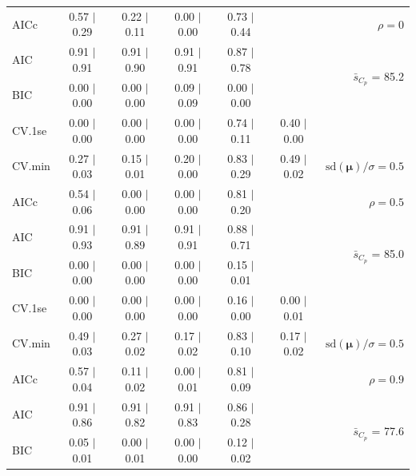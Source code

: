 \documentclass[12pt]{article}
\newcommand{\mr}[1]{\mathrm{#1}}
\newcommand{\bm}[1]{\mathbf{#1}}
\begin{document}
\begin{table}[p]
\begin{center}
\begin{tabular}{l*{5}{c}|r}
AICc & 0.57 $\mid$ 0.29 & 0.22 $\mid$ 0.11 & 0.00 $\mid$ 0.00 & 0.73 $\mid$ 0.44 & & $\rho=0$ \\
AIC & 0.91 $\mid$ 0.91 & 0.91 $\mid$ 0.90 & 0.91 $\mid$ 0.91 & 0.87 $\mid$ 0.78 & & \multirow{2}{*}{$\bar{s}_{C_p}$ = 85.2} \\
BIC & 0.00 $\mid$ 0.00 & 0.00 $\mid$ 0.00 & 0.09 $\mid$ 0.09 & 0.00 $\mid$ 0.00 & & \\
 \hline 
CV.1se & 0.00 $\mid$ 0.00 & 0.00 $\mid$ 0.00 & 0.00 $\mid$ 0.00 & 0.74 $\mid$ 0.11 & 0.40 $\mid$ 0.00 &\\
CV.min & 0.27 $\mid$ 0.03 & 0.15 $\mid$ 0.01 & 0.20 $\mid$ 0.00 & 0.83 $\mid$ 0.29 & 0.49 $\mid$ 0.02 &  $\mr{sd}(\bm{\mu})/\sigma=0.5$ \\
AICc & 0.54 $\mid$ 0.06 & 0.00 $\mid$ 0.00 & 0.00 $\mid$ 0.00 & 0.81 $\mid$ 0.20 & & $\rho=0.5$ \\
AIC & 0.91 $\mid$ 0.93 & 0.91 $\mid$ 0.89 & 0.91 $\mid$ 0.91 & 0.88 $\mid$ 0.71 & & \multirow{2}{*}{$\bar{s}_{C_p}$ = 85.0} \\
BIC & 0.00 $\mid$ 0.00 & 0.00 $\mid$ 0.00 & 0.00 $\mid$ 0.00 & 0.15 $\mid$ 0.01 & & \\
 \hline 
CV.1se & 0.00 $\mid$ 0.00 & 0.00 $\mid$ 0.00 & 0.00 $\mid$ 0.00 & 0.16 $\mid$ 0.00 & 0.00 $\mid$ 0.01 &\\
CV.min & 0.49 $\mid$ 0.03 & 0.27 $\mid$ 0.02 & 0.17 $\mid$ 0.02 & 0.83 $\mid$ 0.10 & 0.17 $\mid$ 0.02 &  $\mr{sd}(\bm{\mu})/\sigma=0.5$ \\
AICc & 0.57 $\mid$ 0.04 & 0.11 $\mid$ 0.02 & 0.00 $\mid$ 0.01 & 0.81 $\mid$ 0.09 & & $\rho=0.9$ \\
AIC & 0.91 $\mid$ 0.86 & 0.91 $\mid$ 0.82 & 0.91 $\mid$ 0.83 & 0.86 $\mid$ 0.28 & & \multirow{2}{*}{$\bar{s}_{C_p}$ = 77.6} \\
BIC & 0.05 $\mid$ 0.01 & 0.00 $\mid$ 0.01 & 0.00 $\mid$ 0.00 & 0.12 $\mid$ 0.02 & & \\
 \hline 
 \end{tabular}
\end{center}
\vspace{-1cm}
\end{table}
\end{document}
